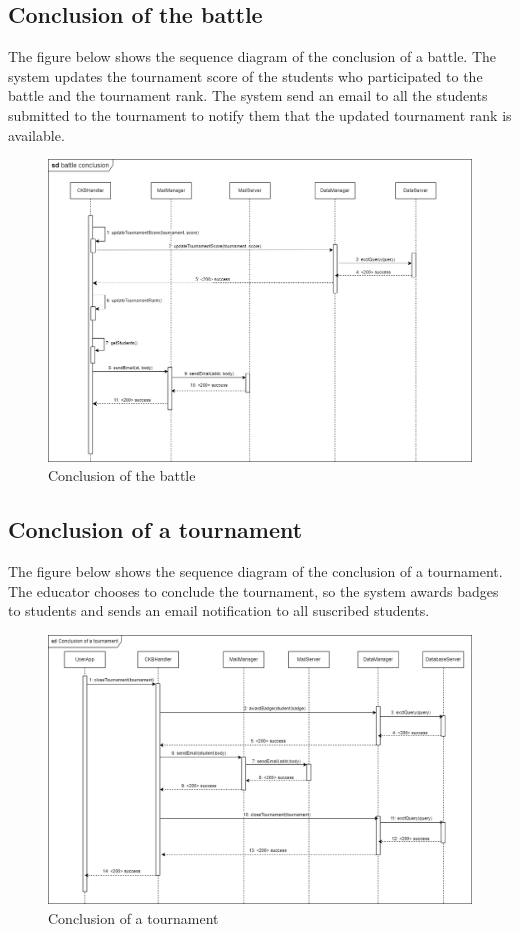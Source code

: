 \subsection{Conclusion of the battle}
The figure below shows the sequence diagram of the conclusion of a battle. The system updates the tournament
score of the students who participated to the battle and the tournament rank. The system send an email to all the students submitted
to the tournament to notify them that the updated tournament rank is available.
\begin{figure}[H]
    \centering
    \includegraphics[width=1\textwidth]{images/seq_diagrams/battle_conclusion_DD.png}
    \caption{Conclusion of the battle}
\end{figure}
\clearpage

\subsection{Conclusion of a tournament}
The figure below shows the sequence diagram of the conclusion of a tournament. The educator chooses to conclude the tournament, so the system 
awards badges to students and sends an email notification to all suscribed students.
\begin{figure}[H]
    \centering
    \includegraphics[width=1\textwidth]{images/seq_diagrams/tournament_conclusion_DD.png}
    \caption{Conclusion of a tournament}
\end{figure}
\clearpage

